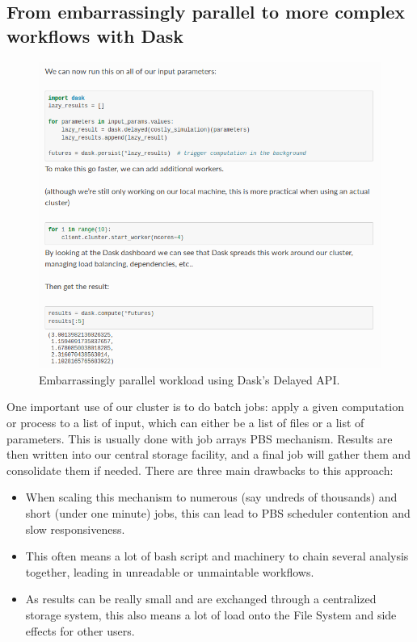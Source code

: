 \documentclass{article}
\begin{document}
\subsection{From embarrassingly parallel to more complex workflows with Dask}
\label{ssec:usecase1}

\begin{figure}
  \centering
  \includegraphics[width=\columnwidth]{ep_dask_code.png}
  \caption{\label{ep_dask_code} Embarrassingly parallel workload using Dask's Delayed API.}
\end{figure}

One important use of our cluster is to do batch jobs: apply a given computation or process to a list of input, which can either be a list of files or a list of parameters. This is usually done with job arrays PBS mechanism. Results are then written into our central storage facility, and a final job will gather them and consolidate them if needed. There are three main drawbacks to this approach:
\begin{itemize}
\item When scaling this mechanism to numerous (say undreds of thousands) and short (under one minute) jobs, this can lead to PBS scheduler contention and slow responsiveness.
\item This often means a lot of bash script and machinery to chain several analysis together, leading in unreadable or unmaintable workflows.
\item As results can be really small and are exchanged through a centralized storage system, this also means a lot of load onto the File System and side effects for other users.
\end{itemize}
\end{document}
